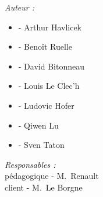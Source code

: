 \documentclass[12pt]{article}
\begin{document}
\begin{center}
\begin{center}
                    \begin{flushleft} 
                      \large
                      \emph{Auteur :}\\
                      \begin{itemize}
                        \item - Arthur Havlicek
						\item - Benoît Ruelle
                        \item - David Bitonneau
                        \item - Louis Le Clec'h
                        \item - Ludovic Hofer
                        \item - Qiwen Lu
                        \item - Sven Taton
                      \end{itemize}
                    \end{flushleft}
                    
                    
                    \begin{flushright} 
                      \large
                      \emph{Responsables :} \\
                      \small{pédagogique} - M.~Renault \\
                      \small{client} - M.~Le Borgne\\
                    \end{flushright}
                  \end{center}
                  
                  
                  
                  
\end{center}





\end{document}
